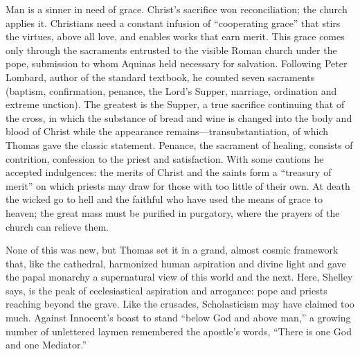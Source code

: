 Man is a sinner in need of grace. Christ's sacrifice won reconciliation; the church applies it.
Christians need a constant infusion of ``cooperating grace'' that stirs the virtues, above all love,
and enables works that earn merit. This grace comes only through the sacraments entrusted to the
visible Roman church under the pope, submission to whom Aquinas held necessary for salvation. Following
Peter Lombard, author of the standard textbook, he counted seven sacraments (baptism, confirmation, penance, the Lord's Supper, marriage, ordination and extreme unction). The greatest is the Supper, a
true sacrifice continuing that of the cross, in which the substance of bread and wine is changed into
the body and blood of Christ while the appearance remains---transubstantiation, of which Thomas
gave the classic statement. Penance, the sacrament of healing, consists of contrition, confession to
the priest and satisfaction. With some cautions he accepted indulgences: the merits of Christ and the
saints form a ``treasury of merit'' on which priests may draw for those with too little of their own.
At death the wicked go to hell and the faithful who have used the means of grace to heaven; the great
mass must be purified in purgatory, where the prayers of the church can relieve them.

None of this was new, but Thomas set it in a grand, almost cosmic framework that, like the cathedral,
harmonized human aspiration and divine light and gave the papal monarchy a supernatural view of this
world and the next. Here, Shelley says, is the peak of ecclesiastical aspiration and arrogance: pope
and priests reaching beyond the grave. Like the crusades, Scholasticism may have claimed too much.
Against Innocent's boast to stand ``below God and above man,'' a growing number of unlettered laymen
remembered the apostle's words, ``There is one God and one Mediator.''

\begin{keyfacts}
\end{keyfacts}
